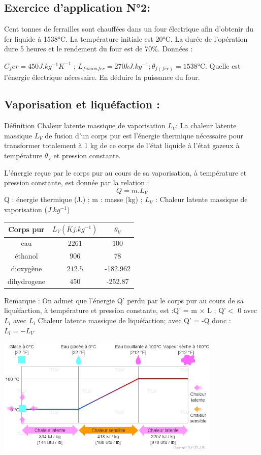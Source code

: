 \documentclass[12pt]{article}
\begin{document}
\subsection{Exercice d'application N°2:}
Cent tonnes de ferrailles sont chauffées dans un four électrique afin d'obtenir du fer
liquide à 1538°C. La température initiale est 20°C. La durée de l'opération dure 5 heures
et le rendement du four est de 70\%.
Données : 

$C_fer = 450 J.kg^{-1}K^{-1}$ ; $L_{fusion fer}= 270 kJ.kg^{-1} ; \theta_{f(fer)} = 1538$°C. Quelle est l'énergie électrique nécessaire. En déduire la puissance du four.

\subsection{Vaporisation et liquéfaction :}
Définition Chaleur latente massique de vaporisation $L_V$:
La chaleur latente massique $L_V$ de fusion d'un corps pur est l'énergie thermique
nécessaire pour transformer totalement à 1 kg de ce corps de l'état liquide à l'état
gazeux à température $\theta_V$ et pression constante.

L'énergie reçue par le corps pur au cours de sa vaporisation, à température et
pression constante, est donnée par la relation :
$$Q = m.L_V$$
Q : énergie thermique (J.) ; m : masse (kg) ; $L_V$ : Chaleur latente massique de vaporisation ($J.kg^{-1}$)
\begin{center}
\begin{tabular}{|c|c|c|}
    \hline
    Corps pur     &$L_V(Kj.kg^{-1})$ &$\theta_V$\\\hline
    eau           & $2261$  & 100 \\\hline
    éthanol       &  $906$  & 78\\\hline
    dioxygène     & $212.5$ & -182.962\\\hline
    dihydrogene   & $450$   & -252.87\\\hline
    \end{tabular}
\end{center}

Remarque :
On admet que l'énergie Q' perdu par le corps pur au cours de sa liquéfaction, à
température et pression constante, est :Q' = m × L ; Q'$<$ 0 avec $L_l$ avec $L_l$ Chaleur
latente massique de liquéfaction; avec Q' = -Q donc : $L_l = -L_V$
\begin{center}

   \includegraphics[width=0.8\textwidth]{./img/img02-1.png}
\end{center}
\end{document}
